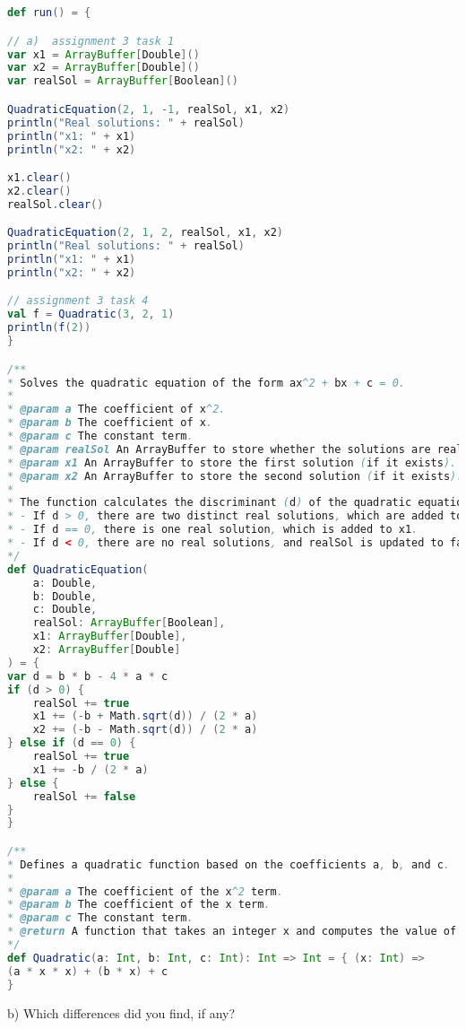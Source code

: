 \documentclass[11pt,a4paper]{report}
\begin{document}
\section{}

\begin{lstlisting}[language=scala]
def run() = {

// a)  assignment 3 task 1
var x1 = ArrayBuffer[Double]()
var x2 = ArrayBuffer[Double]()
var realSol = ArrayBuffer[Boolean]()

QuadraticEquation(2, 1, -1, realSol, x1, x2)
println("Real solutions: " + realSol)
println("x1: " + x1)
println("x2: " + x2)

x1.clear()
x2.clear()
realSol.clear()

QuadraticEquation(2, 1, 2, realSol, x1, x2)
println("Real solutions: " + realSol)
println("x1: " + x1)
println("x2: " + x2)

// assignment 3 task 4
val f = Quadratic(3, 2, 1)
println(f(2))
}

/**
* Solves the quadratic equation of the form ax^2 + bx + c = 0.
*
* @param a The coefficient of x^2.
* @param b The coefficient of x.
* @param c The constant term.
* @param realSol An ArrayBuffer to store whether the solutions are real (true) or not (false).
* @param x1 An ArrayBuffer to store the first solution (if it exists).
* @param x2 An ArrayBuffer to store the second solution (if it exists).
*
* The function calculates the discriminant (d) of the quadratic equation:
* - If d > 0, there are two distinct real solutions, which are added to x1 and x2.
* - If d == 0, there is one real solution, which is added to x1.
* - If d < 0, there are no real solutions, and realSol is updated to false.
*/
def QuadraticEquation(
    a: Double,
    b: Double,
    c: Double,
    realSol: ArrayBuffer[Boolean],
    x1: ArrayBuffer[Double],
    x2: ArrayBuffer[Double]
) = {
var d = b * b - 4 * a * c
if (d > 0) {
    realSol += true
    x1 += (-b + Math.sqrt(d)) / (2 * a)
    x2 += (-b - Math.sqrt(d)) / (2 * a)
} else if (d == 0) {
    realSol += true
    x1 += -b / (2 * a)
} else {
    realSol += false
}
}

/**
* Defines a quadratic function based on the coefficients a, b, and c.
*
* @param a The coefficient of the x^2 term.
* @param b The coefficient of the x term.
* @param c The constant term.
* @return A function that takes an integer x and computes the value of the quadratic equation a*x^2 + b*x + c.
*/
def Quadratic(a: Int, b: Int, c: Int): Int => Int = { (x: Int) =>
(a * x * x) + (b * x) + c
}
\end{lstlisting}
b)  Which differences did you find, if any?
\end{document}

